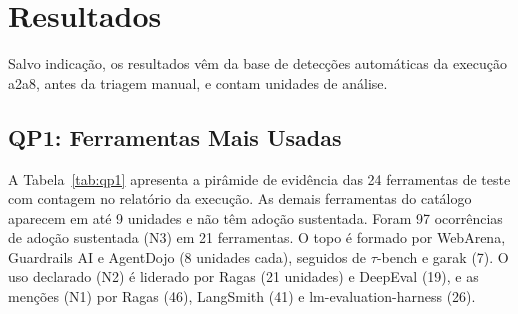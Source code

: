 \documentclass[sigconf]{acmart}
\begin{document}
\section{Resultados}
\label{sec:resultados}

Salvo indicação, os resultados vêm da base de detecções automáticas da execução a2a8, antes da triagem manual, e contam unidades de análise.

\subsection{QP1: Ferramentas Mais Usadas}

A Tabela~\ref{tab:qp1} apresenta a pirâmide de evidência das 24 ferramentas de teste com contagem no relatório da execução. As demais ferramentas do catálogo aparecem em até 9 unidades e não têm adoção sustentada. Foram 97 ocorrências de adoção sustentada (N3) em 21 ferramentas. O topo é formado por WebArena, Guardrails AI e AgentDojo (8 unidades cada), seguidos de $\tau$-bench e garak (7). O uso declarado (N2) é liderado por Ragas (21 unidades) e DeepEval (19), e as menções (N1) por Ragas (46), LangSmith (41) e lm-evaluation-harness (26).
\end{document}
